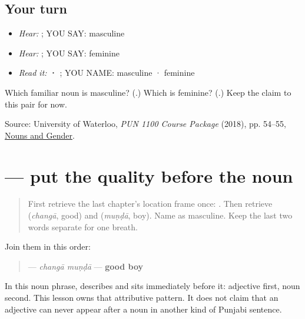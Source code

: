 \subsection*{Your turn}
\begin{itemize}
\raggedright
  \item \emph{Hear:} \textbf{}; YOU SAY: masculine
  \item \emph{Hear:} \textbf{}; YOU SAY: feminine
  \item \emph{Read it:} \textbf{ · }; YOU NAME: masculine · feminine
\end{itemize}

\begin{tcolorbox}[breakable,colback=teal!4,colframe=teal!35!black,title={Before you move on}]
Which familiar noun is masculine? (\textbf{}.) Which is feminine? (\textbf{}.) Keep the claim to this pair for now.

Source: University of Waterloo, \emph{PUN 1100 Course Package} (2018), pp. 54–55, \href{https://openlibrary-repo.ecampusontario.ca/jspui/bitstream/123456789/492/2/2018Pun1100CoursePackage.pdf}{Nouns and Gender}.
\end{tcolorbox}
\section[\texorpdfstring{\pa{ਚੰਗਾ} \pa{ਮੁੰਡਾ} (changa munda)}{ਚੰਗਾ ਮੁੰਡਾ (changa munda)}]{  — put the quality before the noun}

\label{lesson:PA-C177-adjective-position}



\begin{quote}
First retrieve the last chapter's location frame once: \textbf{   }. Then retrieve \textbf{} (\emph{changā}, good) and \textbf{} (\emph{muṇḍā}, boy). Name \textbf{} as masculine. Keep the last two words separate for one breath.
\end{quote}

\begin{grammarlens}[title={Grammar Lens: one attributive position}]
Join them in this order:

\begin{quote}
\textbf{ } — \emph{changā muṇḍā} — \textbf{good boy}
\end{quote}

In this noun phrase, \textbf{} describes \textbf{} and sits immediately before it: adjective first, noun second. This lesson owns that attributive pattern. It does not claim that an adjective can never appear after a noun in another kind of Punjabi sentence.
\end{grammarlens}

